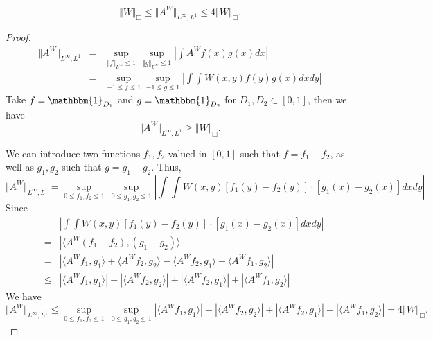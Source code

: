 \begin{lemma}
	$$
	\Vert W \Vert_{\Box} \leq \Vert A^W \Vert_{L^{\infty}, L^1} \leq 4 \Vert W \Vert_{\Box}.
	$$
\end{lemma}
\begin{proof}
	\begin{eqnarray}
	\Vert A^W \Vert_{L^\infty, L^1} &=& \sup_{ \Vert f \Vert_{L^\infty} \leq 1}\, \sup_{ \Vert g \Vert_{L^{\infty}}  \leq 1}  \left\vert \int A^W f(x) g(x) dx  \right\vert \nonumber \\
	&=& \sup_{ -1 \leq f \leq 1} \sup_{-1 \leq g \leq 1 }  \left\vert \int \int W(x,y)f(y) g(x) dxdy \right\vert \label{eq:cut_ineq_p_infty_q_1_lower}
	\end{eqnarray}
	Take $f= \mathbbm{1}_{D_1}$ and $g=\mathbbm{1}_{D_2}$ for $D_1, D_2 \subset [0,1]$, then we have
	$$
	\Vert A^W \Vert_{L^\infty, L^1} \geq \Vert W \Vert_{\Box}.
	$$
	
	We can introduce two functions $f_1,f_2$ valued in $[0,1]$ such that $f= f_1- f_2$, as well as $g_1,g_2$ such that $g=g_1 - g_2$. Thus,
	\begin{equation}
	\Vert A^W \Vert_{L^\infty, L^1} = \sup_{ 0 \leq f_1, f_2 \leq 1 }\, \sup_{ 0 \leq g_1, g_2 \leq 1} \left\vert \int \int W(x,y)[f_1(y)- f_2(y)]\cdot [g_1(x) - g_2(x)] dxdy \right\vert
	\label{eq:cut_ineq_p_infty_q_1_upper}
	\end{equation}
	Since
	\begin{eqnarray*}
		&& \left\vert \int \int W(x,y)[f_1(y)- f_2(y)]\cdot [g_1(x) - g_2(x)] dxdy \right\vert \\
		&=& \left\vert \langle A^W (f_1 - f_2), (g_1-g_2) \rangle \right\vert \\
		&=& \left\vert \langle A^W f_1, g_1 \rangle + \langle A^W f_2, g_2 \rangle - \langle A^W f_2, g_1 \rangle - \langle A^W f_1, g_2 \rangle \right\vert \\
		&\leq& | \langle A^W f_1, g_1 \rangle | + | \langle A^W f_2, g_2 \rangle | + | \langle A^W f_2, g_1 \rangle | + | \langle A^W f_1, g_2 \rangle| 
	\end{eqnarray*}
	We have
	$$
	\Vert A^W \Vert_{L^\infty, L^1} \leq \sup_{ 0 \leq f_1, f_2 \leq 1 }\, \sup_{ 0 \leq g_1, g_2 \leq 1} | \langle A^W f_1, g_1 \rangle | + | \langle A^W f_2, g_2 \rangle | + | \langle A^W f_2, g_1 \rangle | + | \langle A^W f_1, g_2 \rangle|  = 4 \Vert W \Vert_{\Box}.
	$$
\end{proof}


